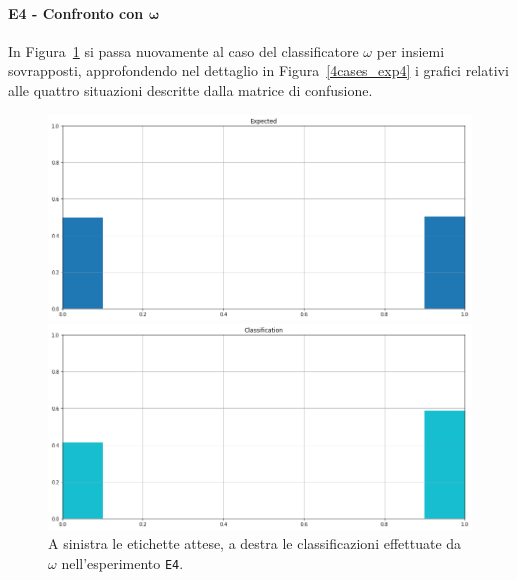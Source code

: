 \documentclass[12pt]{report}
\theoremstyle{definition}
\begin{document}
\paragraph{E4 - Confronto con $\bm{\omega}$}
In Figura~\ref{classification_exp4} si passa nuovamente al caso del classificatore $\omega$ per insiemi sovrapposti, approfondendo nel dettaglio in Figura~\ref{4cases_exp4} i grafici relativi alle quattro situazioni descritte dalla matrice di confusione.
\begin{figure}
\centering
    \begin{minipage}{0.48\textwidth}
        \includegraphics[width=\linewidth]{images/experiment_uniform_sovrapposti/expected_classification.png}
    \end{minipage}
    \begin{minipage}{0.48\textwidth}
        \includegraphics[width=\linewidth]{images/experiment_uniform_sovrapposti/prediction_classification.png}
    \end{minipage}
    \caption{A sinistra le etichette attese, a destra le classificazioni effettuate da $\omega$ nell'esperimento \texttt{E4}.}
    \label{classification_exp4}
\end{figure}
\end{document}
